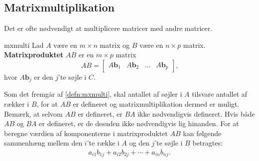 \subsection{Matrixmultiplikation}

Det er ofte nødvendigt at multiplicere matricer med andre matricer. 
\begin{defn}{}{mxmulti}
Lad $A$ være en $m \times n$ matrix og $B$ være en $n \times p$ matrix.
\textbf{Matrixproduktet} $AB$  er en $m \times p$ matrix 
$$
AB=
\begin{bmatrix}
A\textbf{b}_1 & A\textbf{b}_2 & \ldots & A\textbf{b}_p
\end{bmatrix}\text{,}
$$
hvor $A\textbf{b}_j$ er den $j$'te søjle i $C$.
\end{defn}
\noindent
%
Som det fremgår af \ref{defn:mxmulti}, skal antallet af søjler i $A$ tilsvare antallet af rækker i $B$, for at $AB$ er defineret og matrixmultiplikation dermed er muligt. 
Bemærk, at selvom $AB$ er defineret, er $BA$ ikke nødvendigvis defineret. 
Hvis både $AB$ og $BA$ er defineret, er de desuden ikke nødvendigvis lig hinanden. 
For at beregne værdien af komponenterne i matrixproduktet $AB$ kan følgende sammenhæng mellem den $i$'te række i $A$ og den $j$'te søjle i $B$ betragtes: 
\begin{align*}
a_{i1}b_{1j} + a_{i2}b_{2j} + \cdots + a_{in}b_{nj}
\text{.}
\end{align*}
%
